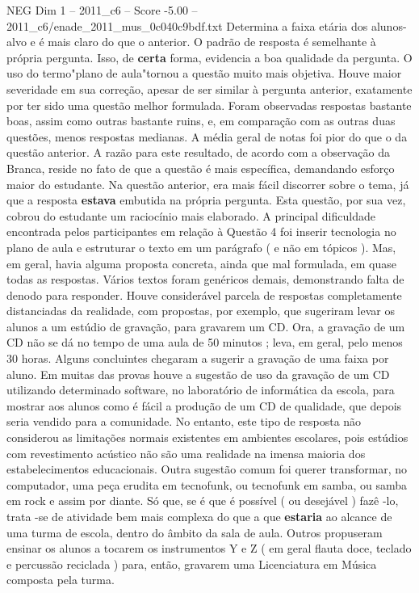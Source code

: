 \begin{textsample}{NEG Dim 1 – 2011\_c6 – Score -5.00 – 2011\_c6/enade\_2011\_mus\_0c040c9bdf.txt}
Determina a faixa etária dos alunos-alvo e é mais claro do que o anterior.
O padrão de resposta é semelhante à própria pergunta.
Isso, de \textbf{certa} forma, evidencia a boa qualidade da pergunta.
O uso do termo"plano de aula"tornou a questão muito mais objetiva.
Houve maior severidade em sua correção, apesar de ser similar à pergunta anterior, exatamente por ter sido uma questão melhor formulada.
Foram observadas respostas bastante boas, assim como outras bastante ruins, e, em comparação com as outras duas questões, menos respostas medianas.
A média geral de notas foi pior do que o da questão anterior.
A razão para este resultado, de acordo com a observação da Branca, reside no fato de que a questão é mais específica, demandando esforço maior do estudante.
Na questão anterior, era mais fácil discorrer sobre o tema, já que a resposta \textbf{estava} embutida na própria pergunta.
Esta questão, por sua vez, cobrou do estudante um raciocínio mais elaborado.
A principal dificuldade encontrada pelos participantes em relação à Questão 4 foi inserir tecnologia no plano de aula e estruturar o texto em um parágrafo ( e não em tópicos ).
Mas, em geral, havia alguma proposta concreta, ainda que mal formulada, em quase todas as respostas.
Vários textos foram genéricos demais, demonstrando falta de denodo para responder.
Houve considerável parcela de respostas completamente distanciadas da realidade, com propostas, por exemplo, que sugeriram levar os alunos a um estúdio de gravação, para gravarem um CD.
Ora, a gravação de um CD não se dá no tempo de uma aula de 50 minutos ; leva, em geral, pelo menos 30 horas.
Alguns concluintes chegaram a sugerir a gravação de uma faixa por aluno.
Em muitas das provas houve a sugestão de uso da gravação de um CD utilizando determinado software, no laboratório de informática da escola, para mostrar aos alunos como é fácil a produção de um CD de qualidade, que depois seria vendido para a comunidade.
No entanto, este tipo de resposta não considerou as limitações normais existentes em ambientes escolares, pois estúdios com revestimento acústico não são uma realidade na imensa maioria dos estabelecimentos educacionais.
Outra sugestão comum foi querer transformar, no computador, uma peça erudita em tecnofunk, ou tecnofunk em samba, ou samba em rock e assim por diante.
Só que, se é que é possível ( ou desejável ) fazê -lo, trata -se de atividade bem mais complexa do que a que \textbf{estaria} ao alcance de uma turma de escola, dentro do âmbito da sala de aula.
Outros propuseram ensinar os alunos a tocarem os instrumentos Y e Z ( em geral flauta doce, teclado e percussão reciclada ) para, então, gravarem uma Licenciatura em Música composta pela turma.

\end{textsample}
